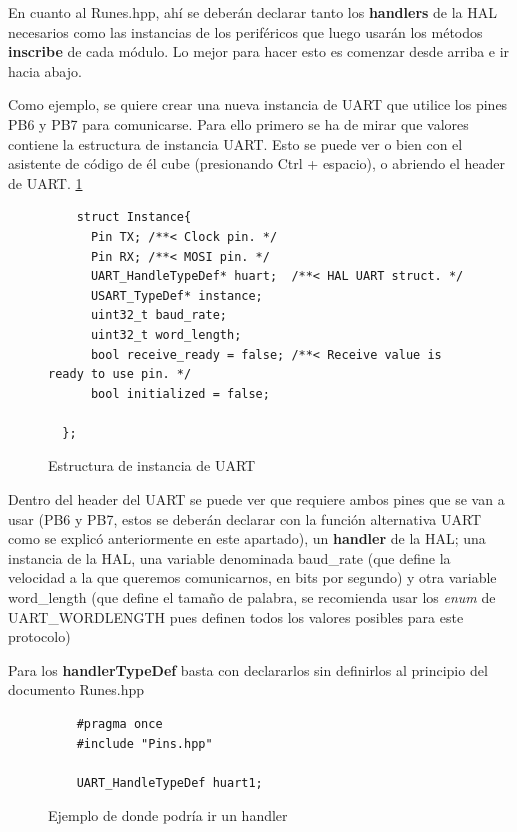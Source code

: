 \documentclass{report}
\begin{document}
\par \vspace{0.3cm}
En cuanto al Runes.hpp, ahí se deberán declarar tanto los \textbf{handlers} de la HAL necesarios como las instancias de los periféricos que luego usarán los métodos \textbf{inscribe} de cada módulo. Lo mejor para hacer esto es comenzar desde arriba e ir hacia abajo. \par \vspace{0.3cm}
Como ejemplo, se quiere crear una nueva instancia de UART que utilice los pines PB6 y PB7 para comunicarse. Para ello primero se ha de mirar que valores contiene la estructura de instancia UART. Esto se puede ver o bien con el asistente de código de él cube (presionando Ctrl + espacio), o abriendo el header de UART. \ref{UARTinstancestruct}
\begin{figure}[H]
  \begin{lstlisting}
    struct Instance{
      Pin TX; /**< Clock pin. */
      Pin RX; /**< MOSI pin. */
      UART_HandleTypeDef* huart;  /**< HAL UART struct. */
      USART_TypeDef* instance;
      uint32_t baud_rate;
      uint32_t word_length;
      bool receive_ready = false; /**< Receive value is ready to use pin. */
      bool initialized = false;

  };
  \end{lstlisting}
  \caption{Estructura de instancia de UART}
    \label{UARTinstancestruct}
  \end{figure}
  \par \vspace{0.3cm}
Dentro del header del UART se puede ver que requiere ambos pines que se van a usar (PB6 y PB7, estos se deberán declarar con la función alternativa UART como se explicó anteriormente en este apartado), un \textbf{handler} de la HAL; una instancia de la HAL, una variable denominada baud\_rate (que define la velocidad a la que queremos comunicarnos, en bits por segundo) y otra variable word\_length (que define el tamaño de palabra, se recomienda usar los \textit{enum} de UART\_WORDLENGTH pues definen todos los valores posibles para este protocolo) \par \vspace{0.3cm}
Para los \textbf{handlerTypeDef} basta con declararlos sin definirlos al principio del documento Runes.hpp 

\begin{figure}[h]
  \begin{lstlisting}
    #pragma once
    #include "Pins.hpp"

    UART_HandleTypeDef huart1;
  \end{lstlisting}
  \caption{Ejemplo de donde podría ir un handler}
    \label{UARThandlerdeclaration}
  \end{figure}
  \par \vspace{0.3cm}
  
\end{document}
